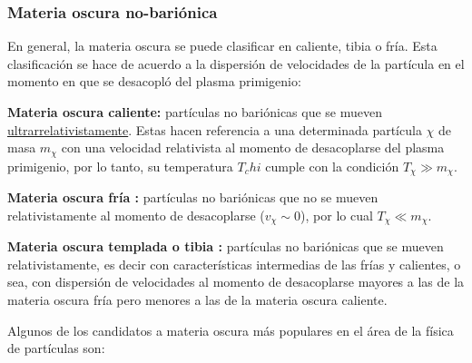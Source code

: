 \subsubsection{Materia oscura no-bariónica} 
En general, la materia oscura se puede clasificar en caliente, tibia o fría. Esta clasificación se hace de acuerdo a la dispersión de velocidades de la partícula en el
momento en que se desacopló del plasma primigenio:
\begin{itemize_f}
\item[-] \textbf{Materia oscura caliente: } partículas no bariónicas que se mueven \href{https://en.wikipedia.org/wiki/Ultrarelativistic_limit}{ultrarrelativistamente}. Estas hacen referencia a una determinada partícula $\chi$ de masa $m_\chi$ con una velocidad relativista al momento de desacoplarse del plasma primigenio, por lo tanto, su temperatura $T_chi$ cumple con la condición $T_\chi \gg m_\chi$. 

\item[-] \textbf{Materia oscura fría :} partículas no bariónicas que no se mueven relativistamente al momento de desacoplarse ($v_\chi \sim 0$), por lo cual $T_\chi \ll m_\chi$. 

\item[-] \textbf{Materia oscura templada o tibia :} partículas no bariónicas que se mueven relativistamente, es decir con
características intermedias de las frías y calientes, o sea, con dispersión de velocidades al momento de desacoplarse mayores a las de la materia oscura fría pero menores a las de la materia oscura caliente.
\end{itemize_f}

Algunos de los candidatos a materia oscura más populares en el área de la física de partículas son: 

